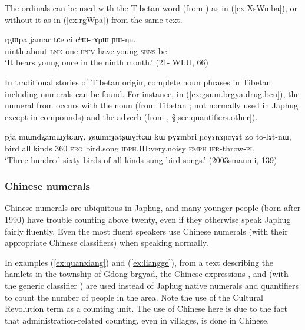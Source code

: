 The ordinals can be used with the Tibetan word  (from ) as in (\ref{ex:XsWmba}), or without it as in (\ref{ex:rgWpa}) from the same text.

\begin{exe}
\ex \label{ex:rgWpa}
\gll  rgɯpa jamar tɕe ci cʰɯ-rɤpɯ ɲɯ-ŋu. \\
ninth about \textsc{lnk} one \textsc{ipfv}-have.young  \textsc{sens}-be \\
\glt `It bears young once in the ninth month.' (21-lWLU, 66)
\end{exe}

In traditional stories of Tibetan origin, complete noun phrases in Tibetan including numerals can be found. For instance, in (\ref{ex:gsum.brgya.drug.bcu}), the numeral  from  occurs with the noun   (from Tibetan ; not normally used in Japhug except in compounds) and the adverb  (from , §\ref{sec:quantifiers.other}).

\begin{exe}
\ex \label{ex:gsum.brgya.drug.bcu}
\gll pja mɯndʐamɯχtɕɯɣ, χsɯmrɟatʂɯɣftɕɯ kɯ pɣɤmbri ɲcɣɤnɤɲcɣɤt ʑo to-lɤt-nɯ, \\
 bird all.kinds 360 \textsc{erg} bird.song \textsc{idph}.III:very.noisy \textsc{emph} \textsc{ifr}-throw-\textsc{pl} \\
\glt `Three hundred sixty birds of all kinds sung bird songs.' (2003smanmi, 139)
\end{exe}

\subsubsection{Chinese numerals}  \label{sec:chinese.numerals}
Chinese numerals are ubiquitous in Japhug, and many younger people (born after 1990) have trouble counting above twenty, even if they otherwise speak Japhug fairly fluently. Even the most fluent speakers use Chinese numerals (with their appropriate Chinese classifiers) when speaking normally. 

In examples (\ref{ex:quanxiang}) and (\ref{ex:liangge}), from a text describing the hamlets in the township of Gdong-brgyad, the Chinese expressions ,  and  (with the generic classifier ) are used instead of Japhug native numerals and quantifiers to count the number of people in the area. Note the use of the Cultural Revolution term  as a counting unit. The use of Chinese here is due to the fact that administration-related counting, even in villages, is done in Chinese.

